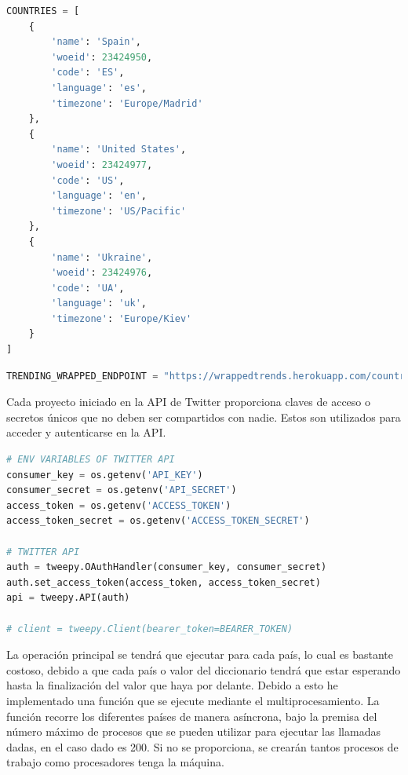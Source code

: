 \vspace{0.3cm}

\begin{lstlisting}[caption=Declaraciones de paises,          label={lst:listing-python},language=Python]
COUNTRIES = [
    {
        'name': 'Spain',
        'woeid': 23424950,
        'code': 'ES',
        'language': 'es',
        'timezone': 'Europe/Madrid'
    },
    {
        'name': 'United States',
        'woeid': 23424977,
        'code': 'US',
        'language': 'en',
        'timezone': 'US/Pacific'
    },
    {
        'name': 'Ukraine',
        'woeid': 23424976,
        'code': 'UA',
        'language': 'uk',
        'timezone': 'Europe/Kiev'
    }
]
\end{lstlisting}

\begin{lstlisting}[caption=Declaración de \textit{endpoint},          label={lst:listing-python},language=Python]
TRENDING_WRAPPED_ENDPOINT = "https://wrappedtrends.herokuapp.com/country/"
\end{lstlisting}

Cada proyecto iniciado en la API de Twitter proporciona claves de acceso o secretos únicos que no deben ser compartidos con nadie. Estos son utilizados para acceder y autenticarse en la API.

\vspace{0.3cm}

\begin{lstlisting}[caption=Autentificación de la API de Twitter,          label={lst:listing-python},language=Python]
# ENV VARIABLES OF TWITTER API
consumer_key = os.getenv('API_KEY')
consumer_secret = os.getenv('API_SECRET')
access_token = os.getenv('ACCESS_TOKEN')
access_token_secret = os.getenv('ACCESS_TOKEN_SECRET')

# TWITTER API
auth = tweepy.OAuthHandler(consumer_key, consumer_secret)
auth.set_access_token(access_token, access_token_secret)
api = tweepy.API(auth)

# client = tweepy.Client(bearer_token=BEARER_TOKEN)
\end{lstlisting}

La operación principal se tendrá que ejecutar para cada país, lo cual es bastante costoso, debido a que cada país o valor del diccionario tendrá que estar esperando hasta la finalización del valor que haya por delante. Debido a esto he implementado una función que se ejecute mediante el multiprocesamiento. La función recorre los diferentes países de manera asíncrona, bajo la premisa del número máximo de procesos que se pueden utilizar para ejecutar las llamadas dadas, en el caso dado es 200. Si no se proporciona, se crearán tantos procesos de trabajo como procesadores tenga la máquina.

